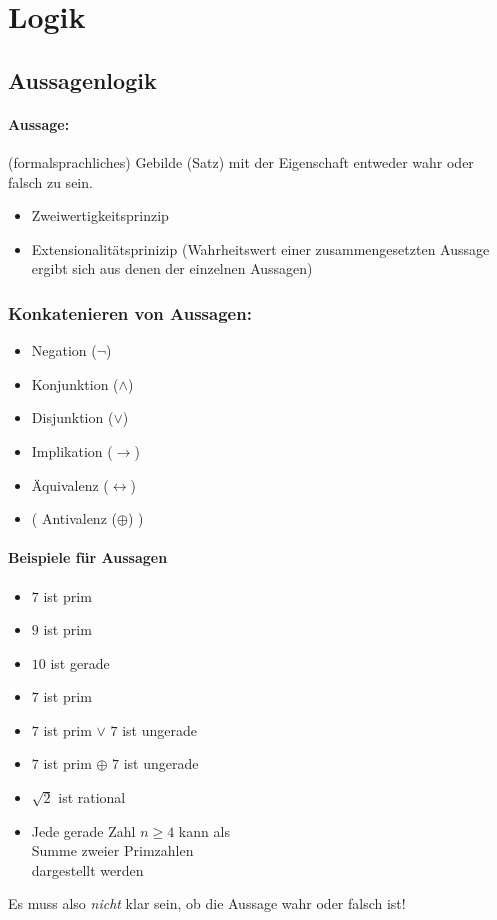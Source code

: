 \section{Logik}
\subsection{Aussagenlogik}
\paragraph{Aussage:}(formalsprachliches) Gebilde (Satz) mit der Eigenschaft entweder wahr oder falsch zu sein.
%
\begin{itemize}
\item Zweiwertigkeitsprinzip
\item Extensionalitätsprinizip (Wahrheitswert einer zusammengesetzten Aussage ergibt sich aus denen der einzelnen Aussagen)
\end{itemize}
%
\subsubsection{Konkatenieren von Aussagen:}
\begin{itemize}
\item Negation (\( \neg \)) 
\item Konjunktion (\( \land \)) 
\item Disjunktion (\( \lor \)) 
\item Implikation (\( \rightarrow \)) 
\item Äquivalenz (\( \leftrightarrow \)) 
\item ( Antivalenz (\( \oplus \)) ) 
\end{itemize}
%
\paragraph{Beispiele für Aussagen}
\begin{itemize}
\item \glqq $7$ ist prim\grqq{}
\item \glqq $9$ ist prim\grqq{}
\item \glqq $10$ ist gerade\grqq{}
\item \glqq $7$ ist prim\grqq{}
\item \glqq $7$ ist prim $\lor$ $7$ ist ungerade\grqq{}
\item \glqq $7$ ist prim $\oplus$ $7$ ist ungerade\grqq{}
\item \glqq $\sqrt{2}$ ist rational\grqq{}
\item \glqq Jede gerade Zahl $n\geq 4$ kann als\\
Summe zweier Primzahlen\\
dargestellt werden\grqq{}
\end{itemize}
%
Es muss also \emph{nicht} klar sein, ob die Aussage wahr oder falsch ist!
%
